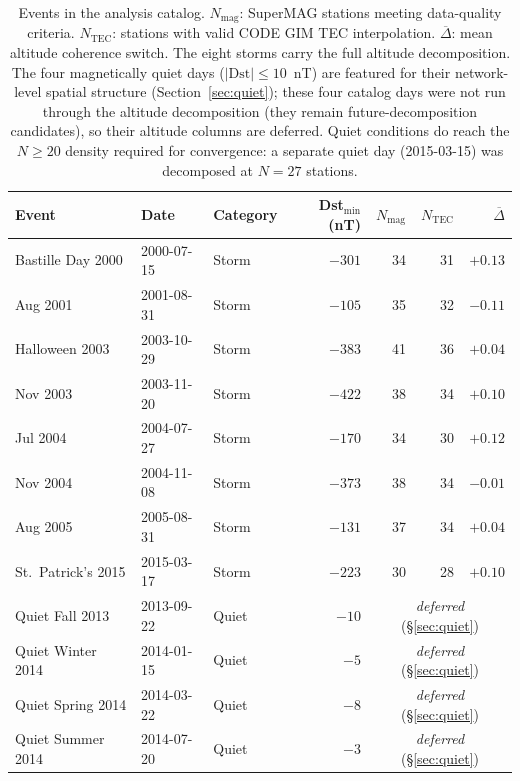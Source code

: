 \documentclass[11pt,letterpaper]{article}
\begin{document}
\begin{table}[t]
\centering
\caption{Events in the analysis catalog. $N_\mathrm{mag}$: SuperMAG stations
  meeting data-quality criteria. $N_\mathrm{TEC}$: stations with valid CODE GIM
  TEC interpolation. $\overline{\Delta}$: mean altitude coherence switch.
  The eight storms carry the full altitude decomposition. The four magnetically
  quiet days ($|\mathrm{Dst}| \leq 10$~nT) are featured for their network-level
  spatial structure (Section~\ref{sec:quiet}); these four catalog days were not
  run through the altitude decomposition (they remain future-decomposition
  candidates), so their altitude columns are deferred. Quiet conditions do reach
  the $N \geq 20$ density required for convergence: a separate quiet day
  (2015-03-15) was decomposed at $N = 27$ stations.}
\label{tab:events}
\begin{tabular}{lllrrrr}
\toprule
Event & Date & Category & Dst$_\mathrm{min}$ (nT) & $N_\mathrm{mag}$ & $N_\mathrm{TEC}$ & $\overline{\Delta}$ \\
\midrule
Bastille Day 2000  & 2000-07-15 & Storm & $-301$ & 34 & 31 & $+0.13$ \\
Aug 2001           & 2001-08-31 & Storm & $-105$ & 35 & 32 & $-0.11$ \\
Halloween 2003     & 2003-10-29 & Storm & $-383$ & 41 & 36 & $+0.04$ \\
Nov 2003           & 2003-11-20 & Storm & $-422$ & 38 & 34 & $+0.10$ \\
Jul 2004           & 2004-07-27 & Storm & $-170$ & 34 & 30 & $+0.12$ \\
Nov 2004           & 2004-11-08 & Storm & $-373$ & 38 & 34 & $-0.01$ \\
Aug 2005           & 2005-08-31 & Storm & $-131$ & 37 & 34 & $+0.04$ \\
St.~Patrick's 2015 & 2015-03-17 & Storm & $-223$ & 30 & 28 & $+0.10$ \\
\midrule
Quiet Fall 2013    & 2013-09-22 & Quiet & $-10$ & \multicolumn{3}{c}{\emph{deferred} (\S\ref{sec:quiet})} \\
Quiet Winter 2014  & 2014-01-15 & Quiet & $-5$  & \multicolumn{3}{c}{\emph{deferred} (\S\ref{sec:quiet})} \\
Quiet Spring 2014  & 2014-03-22 & Quiet & $-8$  & \multicolumn{3}{c}{\emph{deferred} (\S\ref{sec:quiet})} \\
Quiet Summer 2014  & 2014-07-20 & Quiet & $-3$  & \multicolumn{3}{c}{\emph{deferred} (\S\ref{sec:quiet})} \\
\bottomrule
\end{tabular}
\end{table}
\end{document}
